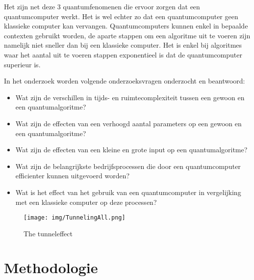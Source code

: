 Het zijn net deze 3 quantumfenomenen die ervoor zorgen dat een quantumcomputer werkt. Het is wel echter zo dat een quantumcomputer geen klassieke computer kan vervangen.
Quantumcomputers kunnen enkel in bepaalde contexten gebruikt worden, de aparte stappen om een algoritme uit te voeren zijn namelijk niet sneller dan bij een klassieke computer.
Het is enkel bij algoritmes waar het aantal uit te voeren stappen exponentieel is dat de quantumcomputer superieur is.

In het onderzoek worden volgende onderzoeksvragen onderzocht en beantwoord:
\begin{itemize}
  \item Wat zijn de verschillen in tijds- en ruimtecomplexiteit tussen een gewoon en een quantumalgoritme?
  \item Wat zijn de effecten van een verhoogd aantal parameters op een gewoon en een quantumalgoritme?
  \item Wat zijn de effecten van een kleine en grote input op een quantumalgoritme?
  \item Wat zijn de belangrijkste bedrijfsprocessen die door een quantumcomputer efficienter kunnen uitgevoerd worden?
  \item Wat is het effect van het gebruik van een quantumcomputer in vergelijking met een klassieke computer op deze processen?
\end{itemize}

\begin{figure} [h]
  \centering
  \texttt{[image: img/TunnelingAll.png]}
      \caption{The tunneleffect}
      \label{fig:tunneleffect}
\end{figure}


\section{Methodologie}
\label{sec:methodologie}

